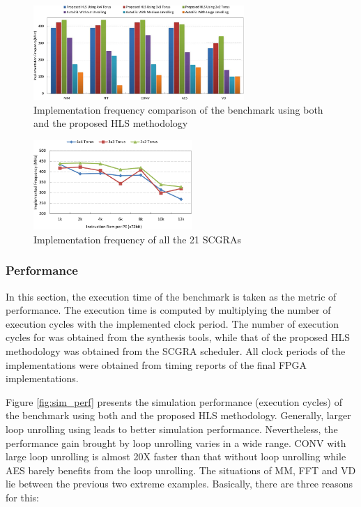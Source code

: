 \begin{figure}[h]
\centering
\includegraphics[width=8cm]{impl_freq}
\vspace{-1em}
\caption{Implementation frequency comparison of the benchmark using both \autoesl and the proposed HLS methodology}
\label{fig:impl_freq}
\vspace{-1em}
\end{figure}

\begin{figure}[h]
\centering
\includegraphics[width=6cm]{lib_impl_freq}
\vspace{-1em}
\caption{Implementation frequency of all the 21 SCGRAs}
\label{fig:lib_impl_freq}
\vspace{-1em}
\end{figure}


\subsubsection{Performance}
In this section, the execution time of the benchmark is taken as the metric of performance. The execution time is computed by multiplying the number of execution cycles with the implemented clock period. The number of execution cycles for \autoesl was obtained from the synthesis tools, while that of the proposed HLS methodology was obtained from the SCGRA scheduler. All clock periods of the implementations were obtained from timing reports of the final FPGA implementations.

Figure \ref{fig:sim_perf} presents the simulation performance (execution cycles) of the benchmark using both \autoesl and the proposed HLS methodology. Generally, larger loop unrolling using \autoesl leads to better simulation performance. Nevertheless, the performance gain brought by loop unrolling varies in a wide range. CONV with large loop unrolling is almost 20X faster than that without loop unrolling while AES barely benefits from the loop unrolling. The situations of MM, FFT and VD lie between the previous two extreme examples. Basically, there are three reasons for this:


